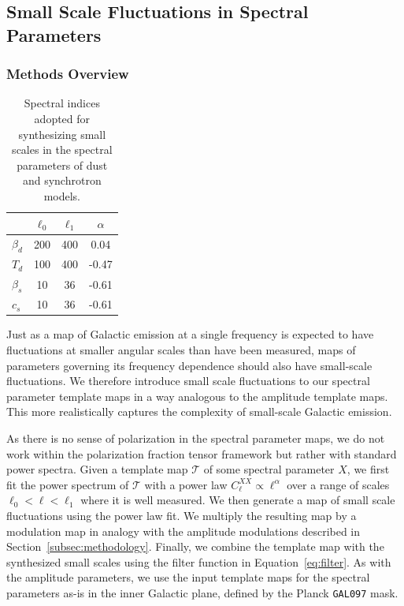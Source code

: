 \documentclass[twocolumn]{aastex631}
\begin{document}
\subsection{Small Scale Fluctuations in Spectral Parameters} \label{sec:spec_params}

\subsubsection{Methods Overview}
\begin{table}
    \centering
    \begin{tabular}{lccc}
    \toprule 
   & $\ell_0$ & $\ell_1$ & $\alpha$  \\
   \midrule  
   $\beta_d$ & 200 & 400 & 0.04 \\ 
   $T_d$ & 100 & 400  & -0.47\\
    \midrule 
    $\beta_s$ & 10 & 36 & -0.61\\
    $c_s$ & 10 & 36 & -0.61  \\ 
   \bottomrule
    \end{tabular}
    \caption{Spectral indices adopted for synthesizing small scales in the spectral parameters of dust and synchrotron models. }
    \label{tab:smallscale_specpar}
\end{table}

Just as a map of Galactic emission at a single frequency is expected to have fluctuations at smaller angular scales than have been measured, maps of parameters governing its frequency dependence should also have small-scale fluctuations. We therefore introduce small scale fluctuations to our spectral parameter template maps in a way analogous to the amplitude template maps. This more realistically captures the complexity of small-scale Galactic emission.

As there is no sense of polarization in the spectral parameter maps, we do not work within the polarization fraction tensor framework but rather with standard power spectra. Given a template map $\mathcal{T}$ of some spectral parameter $X$, we first fit the power spectrum of $\mathcal{T}$ with a power law $C_\ell^{XX} \propto \ell^\alpha$ over a range of scales $\ell_0 < \ell < \ell_1$ where it is well measured. We then generate a map of small scale fluctuations using the power law fit. We multiply the resulting map by a modulation map in analogy with the amplitude modulations described in Section~\ref{subsec:methodology}. Finally, we combine the template map with the synthesized small scales using the filter function in Equation~\ref{eq:filter}. As with the amplitude parameters, we use the input template maps for the spectral parameters as-is in the inner Galactic plane, defined by the Planck \texttt{GAL097} mask.
\end{document}
